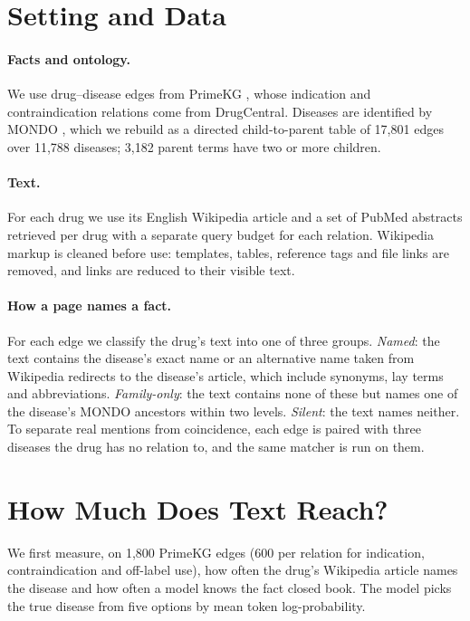 \documentclass[letterpaper]{article} %
\begin{document}
\section{Setting and Data}

\paragraph{Facts and ontology.}
We use drug--disease edges from PrimeKG \citep{chandak2023primekg}, whose
indication and contraindication relations come from DrugCentral. Diseases are
identified by MONDO \citep{vasilevsky2022mondo}, which we rebuild as a directed
child-to-parent table of 17,801 edges over 11,788 diseases; 3,182 parent terms
have two or more children.

\paragraph{Text.}
For each drug we use its English Wikipedia article and a set of PubMed
abstracts retrieved per drug with a separate query budget for each relation.
Wikipedia markup is cleaned before use: templates, tables, reference tags and
file links are removed, and links are reduced to their visible text.

\paragraph{How a page names a fact.}
For each edge we classify the drug's text into one of three groups.
\emph{Named}: the text contains the disease's exact name or an alternative
name taken from Wikipedia redirects to the disease's article, which include
synonyms, lay terms and abbreviations. \emph{Family-only}: the text contains
none of these but names one of the disease's MONDO ancestors within two
levels. \emph{Silent}: the text names neither. To separate
real mentions from coincidence, each edge is paired with three diseases the
drug has no relation to, and the same matcher is run on them.

\section{How Much Does Text Reach?}

We first measure, on 1,800 PrimeKG edges (600 per relation for indication,
contraindication and off-label use), how often the drug's Wikipedia article
names the disease and how often a model knows the fact closed book. The model
picks the true disease from five options by mean token log-probability.
\end{document}
